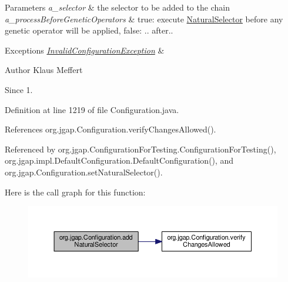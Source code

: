 \begin{DoxyParams}{Parameters}
{\em a\-\_\-selector} & the selector to be added to the chain \\
\hline
{\em a\-\_\-process\-Before\-Genetic\-Operators} & true\-: execute \hyperlink{classorg_1_1jgap_1_1_natural_selector}{Natural\-Selector} before any genetic operator will be applied, false\-: .. after.. \\
\hline
\end{DoxyParams}

\begin{DoxyExceptions}{Exceptions}
{\em \hyperlink{classorg_1_1jgap_1_1_invalid_configuration_exception}{Invalid\-Configuration\-Exception}} & \\
\hline
\end{DoxyExceptions}
\begin{DoxyAuthor}{Author}
Klaus Meffert 
\end{DoxyAuthor}
\begin{DoxySince}{Since}
1. 
\end{DoxySince}


Definition at line 1219 of file Configuration.\-java.



References org.\-jgap.\-Configuration.\-verify\-Changes\-Allowed().



Referenced by org.\-jgap.\-Configuration\-For\-Testing.\-Configuration\-For\-Testing(), org.\-jgap.\-impl.\-Default\-Configuration.\-Default\-Configuration(), and org.\-jgap.\-Configuration.\-set\-Natural\-Selector().



Here is the call graph for this function\-:
\nopagebreak
\begin{figure}[H]
\begin{center}
\leavevmode
\includegraphics[width=350pt]{classorg_1_1jgap_1_1_configuration_af7e58c2226e9c3175f83c26fa7b9dd34_cgraph}
\end{center}
\end{figure}


